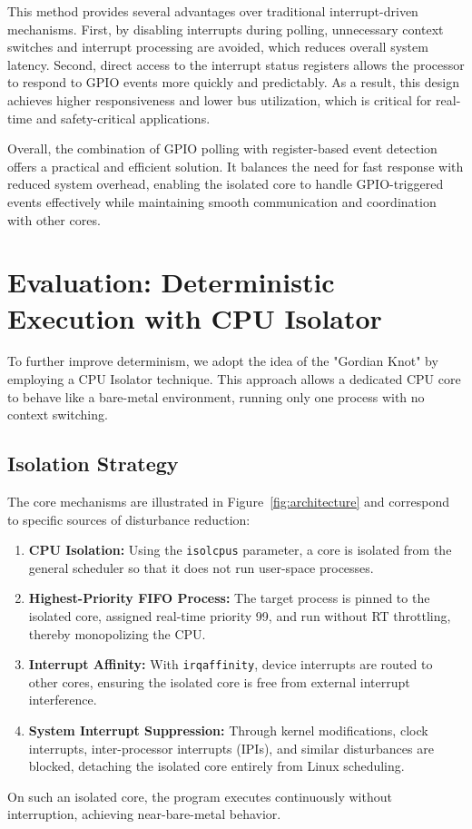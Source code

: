 \documentclass[letterpaper]{article}
\begin{document}
This method provides several advantages over traditional interrupt-driven mechanisms. First,
by disabling interrupts during polling, unnecessary context switches and interrupt processing
are avoided, which reduces overall system latency. Second, direct access to the interrupt status
registers allows the processor to respond to GPIO events more quickly and predictably. As a result,
this design achieves higher responsiveness and lower bus utilization, which is critical for
real-time and safety-critical applications.

Overall, the combination of GPIO polling with register-based event detection offers a practical
and efficient solution. It balances the need for fast response with reduced system overhead,
enabling the isolated core to handle GPIO-triggered events effectively while maintaining smooth
communication and coordination with other cores.


\section{Evaluation: Deterministic Execution with CPU Isolator}

To further improve determinism, we adopt the idea of the "Gordian Knot" by employing a CPU
Isolator technique. This approach allows a dedicated CPU core to behave like a bare-metal
environment, running only one process with no context switching.

\subsection{Isolation Strategy}
The core mechanisms are illustrated in Figure~\ref{fig:architecture} and correspond to specific
sources of disturbance reduction:
\begin{enumerate}
    \item \textbf{CPU Isolation:} Using the \texttt{isolcpus} parameter, a core is isolated from the
    general scheduler so that it does not run user-space processes.
    \item \textbf{Highest-Priority FIFO Process:} The target process is pinned to the isolated core,
    assigned real-time priority 99, and run without RT throttling, thereby monopolizing the CPU.
    \item \textbf{Interrupt Affinity:} With \texttt{irqaffinity}, device interrupts are routed to other cores,
    ensuring the isolated core is free from external interrupt interference.
    \item \textbf{System Interrupt Suppression:} Through kernel modifications, clock interrupts,
    inter-processor interrupts (IPIs), and similar disturbances are blocked, detaching the isolated
    core entirely from Linux scheduling.
\end{enumerate}
On such an isolated core, the program executes continuously without interruption, achieving
near-bare-metal behavior.
\end{document}
